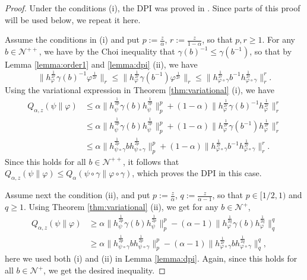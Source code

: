 \documentclass[12pt]{article}
\theoremstyle{definition}
\theoremstyle{remark}
\numberwithin{equation}{section}
\def\Ne{\mathcal N}
\begin{document}
\begin{proof} Under the conditions (i), the DPI was proved in \cite[Theorem 1
(viii)]{kato2023onrenyi}.
 Since parts of this proof will be used below, we repeat it here.

 Assume the conditions in (i) and put $p:=\frac{z}{\alpha}$, $r:=\frac{z}{1-\alpha}$, so
 that  $p,r\ge 1$. 
For any   $b\in \Ne^{++}$, we have by  the Choi inequality \cite{choi1974aschwarz} 
that  $\gamma(b)^{-1}\le \gamma(b^{-1})$, so that  by Lemma \ref{lemma:order1} and
\ref{lemma:dpi} (ii), we have 
\begin{equation}\label{eq:ineq}
\|h_\varphi^{\frac{1}{2r}}\gamma(b)^{-1}\varphi^{\frac{1}{2r}}\|_r\le
\|h_\varphi^{\frac{1}{2r}}\gamma(b^{-1})\varphi^{\frac{1}{2r}}\|_r\le\|h_{\varphi\circ\gamma}^{\frac{1}{2r}}b^{-1}h_{\varphi\circ\gamma}^{\frac{1}{2r}}\|_r^r .
\end{equation}
Using the variational expression in Theorem \ref{thm:variational} (i), we have
\begin{align}\label{eq:dpif}
Q_{\alpha,z}(\psi\|\varphi)&\le \alpha\|h_\psi^{\frac{1}{2p}}\gamma(b)h_\psi^{\frac{1}{2p}}\|_p^p+
(1-\alpha)\|h_\varphi^{\frac{1}{2r}}\gamma(b)^{-1}h_\varphi^{\frac{1}{2r}}\|_r^r\\
&\le  \alpha\|h_\psi^{\frac{1}{2p}}\gamma(b)h_\psi^{\frac{1}{2p}}\|_p^p+
(1-\alpha)\|h_\varphi^{\frac{1}{2r}}\gamma(b^{-1})h_\varphi^{\frac{1}{2r}}\|_r^r\\
&\le  \alpha\|h_{\psi\circ\gamma}^{\frac{1}{2p}}bh_{\psi\circ\gamma}^{\frac{1}{2p}}\|_p^p+
(1-\alpha)\|h_{\varphi\circ\gamma}^{\frac{1}{2r}}b^{-1}h_{\varphi\circ\gamma}^{\frac{1}{2r}}\|_r^r.\label{eq:dpil}
\end{align}
 Since this holds for all
$b\in \Ne^{++}$, it follows that $Q_{\alpha,z}(\psi\|\varphi)\le
Q_{\alpha}(\psi\circ\gamma\|\varphi\circ\gamma)$, which proves the DPI in this case.


Assume next the condition (ii), and put $p:=\frac{z}{\alpha}$, $q:=\frac{z}{\alpha-1}$, so
that $p\in [1/2,1)$ and $q\ge 1$. Using Theorem
\ref{thm:variational} (ii), we get for any $b\in \Ne^+$,
\begin{align*}
Q_{\alpha,z}(\psi\|\varphi)&\ge
\alpha\|h_\psi^{\frac{1}{2p}}\gamma(b)h_\psi^{\frac{1}{2p}}\|_p^p-
(\alpha-1)\|h_\varphi^{\frac{1}{2q}}\gamma(b)h_\varphi^{\frac{1}{2q}}\|_q^q\\
&\ge \alpha\|h_{\psi\circ\gamma}^{\frac{1}{2p}}bh_{\psi\circ\gamma}^{\frac{1}{2p}}\|_p^p-
(\alpha-1)\|h_{\varphi\circ\gamma}^{\frac{1}{2r}}bh_{\varphi\circ\gamma}^{\frac{1}{2q}}\|_q^q,
\end{align*}
here we used both (i) and (ii) in Lemma \ref{lemma:dpi}. Again, since this holds for all
$b\in \Ne^+$, we get the desired inequality.



\end{proof}
\end{document}
